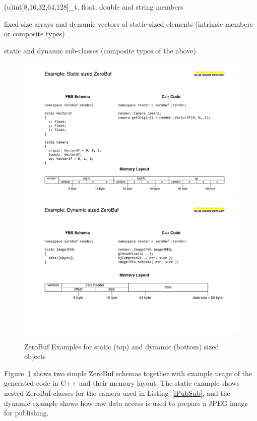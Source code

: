 \documentclass[10pt]{llncs}
\newcommand{\lref}[1]{Listing~\ref{#1}}
\newcommand{\fig}[1]{Figure~\ref{#1}}
\begin{document}
\begin{compactitem}
\item (u)int[8,16,32,64,128]\_t, float, double and string members
\item fixed size arrays and dynamic vectors of static-sized elements (intrinsic
members or composite types)
\item static and dynamic sub-classes (composite types of the above)
\end{compactitem}


\begin{figure}[ht]\center
  \includegraphics[width=\columnwidth]{images/ZeroBufStatic}\\\vspace{4ex}
  \includegraphics[width=\columnwidth]{images/ZeroBufDynamic}
  \caption{\label{fZeroBuf}ZeroBuf Examples for static (top) and dynamic
(bottom) sized objects}
\end{figure}

\fig{fZeroBuf} shows two simple ZeroBuf schemas together with example usage of
the generated code in C++ and their memory layout. The static example shows
nested ZeroBuf classes for the camera used in \lref{lPubSub}, and the dynamic
example shows how raw data access is used to prepare a JPEG image for
publishing.
\end{document}
